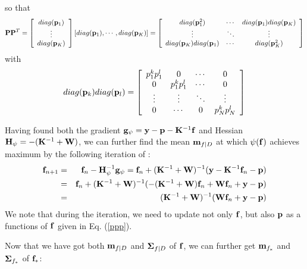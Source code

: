 \documentclass{article}
\begin{document}
so that
\begin{equation}
  {\bf PP}^T=\left[\begin{array}{c}diag({\bf p}_1)\\
      \vdots\\ diag({\bf p}_K)\end{array}\right]
  \left[diag({\bf p}_1),\cdots,diag({\bf p}_K)\right]
  =\left[\begin{array}{ccc}diag({\bf p}_1^2) & \cdots & diag({\bf p}_1) diag({\bf p}_K)\\
      \vdots & \ddots & \vdots \\
      diag({\bf p}_K) diag({\bf p}_1) & \cdots & diag({\bf p}_K^2) 
    \end{array}\right]
\end{equation}
with
\begin{equation}
diag({\bf p}_k) diag({\bf p}_l)=\left[\begin{array}{cccc}
    p_1^kp_1^l & 0 & \cdots & 0\\
    0 & p_1^kp_1^l & \cdots & 0\\
    \vdots & \vdots & \ddots & \vdots \\
    0 & \cdots & 0 & p_N^kp_N^l \end{array}\right]
\end{equation}

Having found both the gradient
${\bf g}_\psi={\bf y}-{\bf p}-{\bf K}^{-1}{\bf f}$ and Hessian 
${\bf H}_\psi=-({\bf K}^{-1}+{\bf W})$, we can further find the
mean ${\bf m}_{f|D}$ at which $\psi({\bf f})$ achieves maximum by 
the following iteration of 
:
\begin{eqnarray}
  {\bf f}_{n+1}&=&{\bf f}_n-{\bf H}_\psi^{-1}{\bf g}_\psi
  ={\bf f}_n+({\bf K}^{-1}+{\bf W})^{-1}({\bf y}-{\bf K}^{-1}{\bf f}_n-{\bf p})
  \nonumber\\
  &=&{\bf f}_n+({\bf K}^{-1}+{\bf W})^{-1}(-({\bf K}^{-1}+{\bf W}){\bf f}_n+{\bf W}{\bf f}_n+{\bf y}-{\bf p})
  \nonumber\\
  &=&({\bf K}^{-1}+{\bf W})^{-1}({\bf W}{\bf f}_n+{\bf y}-{\bf p})
\end{eqnarray}
We note that during the iteration, we need to update not only 
${\bf f}$, but also ${\bf p}$ as a functions of ${\bf f}$ given 
in Eq. (\ref{ppp}).

Now that we have got both ${\bf m}_{f|D}$ and ${\bf\Sigma}_{f|D}$ of
${\bf f}$, we can further get ${\bf m}_{f_*}$ and ${\bf\Sigma}_{f_*}$
of ${\bf f}_*$:
\end{document}
